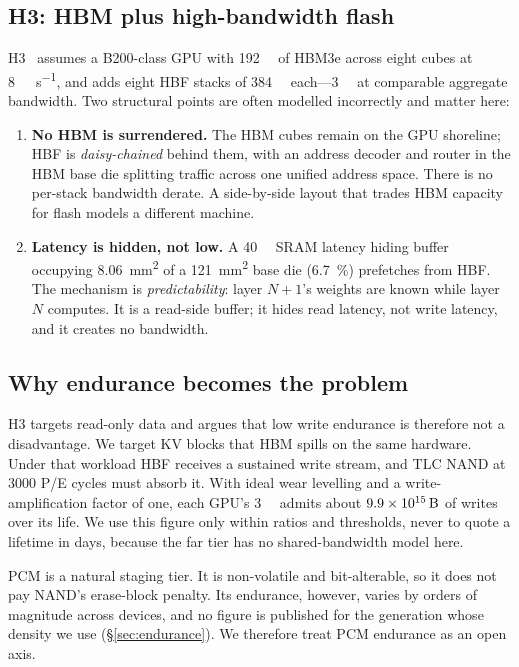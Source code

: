 \documentclass[conference]{IEEEtran}
\begin{document}
\subsection{H3: HBM plus high-bandwidth flash}
H3~\cite{h3} assumes a B200-class GPU with \SI{192}{\giga\byte} of HBM3e across
eight cubes at \SI{8}{\tera\byte\per\second}, and adds eight HBF stacks of
\SI{384}{\giga\byte} each---\SI{3}{\tera\byte} at comparable aggregate
bandwidth. Two structural points are often modelled incorrectly and matter here:

\begin{enumerate}
  \item \textbf{No HBM is surrendered.} The HBM cubes remain on the GPU
        shoreline; HBF is \emph{daisy-chained} behind them, with an address
        decoder and router in the HBM base die splitting traffic across one
        unified address space. There is no per-stack bandwidth derate. A
        side-by-side layout that trades HBM capacity for flash models a
        different machine.
  \item \textbf{Latency is hidden, not low.} A \SI{40}{\mega\byte} SRAM latency
        hiding buffer occupying \SI{8.06}{\milli\meter\squared} of a
        \SI{121}{\milli\meter\squared} base die (\SI{6.7}{\percent}) prefetches
        from HBF. The mechanism is \emph{predictability}: layer $N{+}1$'s
        weights are known while layer $N$ computes. It is a read-side buffer; it
        hides read latency, not write latency, and it creates no bandwidth.
\end{enumerate}

\subsection{Why endurance becomes the problem}
H3 targets read-only data and argues that low write endurance is therefore not a
disadvantage. We target KV blocks that HBM spills on the same hardware. Under
that workload HBF receives a sustained write stream, and TLC NAND at \num{3000}
P/E cycles must absorb it. With ideal wear levelling and a write-amplification
factor of one, each GPU's \SI{3}{\tebi\byte} admits about
$\SI{9.9e15}{\byte}$ of writes over its life. We use this figure only within
ratios and thresholds, never to quote a lifetime in days, because the far tier
has no shared-bandwidth model here.

PCM is a natural staging tier. It is non-volatile and bit-alterable, so it does
not pay NAND's erase-block penalty. Its endurance, however, varies by orders of
magnitude across devices, and no figure is published for the generation whose
density we use (\S\ref{sec:endurance}). We therefore treat PCM endurance as an
open axis.
\end{document}
